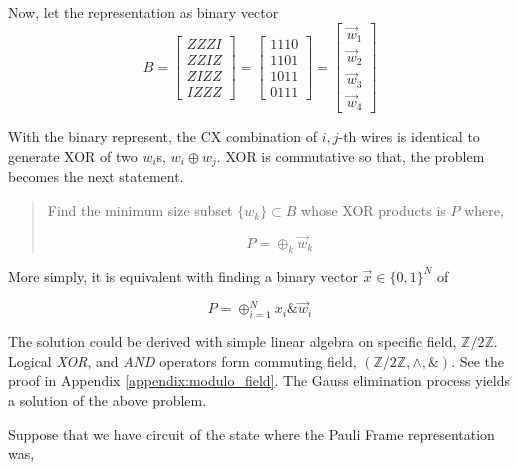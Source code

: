 \documentclass[a4paper,12pt]{article}
\begin{document}
Now, let the representation as binary vector
\begin{equation}
B = \begin{bmatrix}
    ZZZI\\
    ZZIZ\\
    ZIZZ\\
    IZZZ
\end{bmatrix} = \begin{bmatrix}
    1110\\
    1101\\
    1011\\
    0111
\end{bmatrix} = 
\begin{bmatrix}
    \vec{w}_1\\
    \vec{w}_2\\
    \vec{w}_3\\
    \vec{w}_4
\end{bmatrix}
\end{equation}

With the binary represent, 
the CX combination of $i, j$-th wires is identical to generate XOR of two $w_i$s, 
$w_i \oplus w_j$.
XOR is commutative so that, the problem becomes the next statement.

\begin{quotation}
    Find the minimum size subset $\{w_k\} \subset B$ whose XOR products is $P$
    where,

    \begin{equation*}
        P = \oplus_{k} \vec{w}_k 
    \end{equation*}

\end{quotation}

More simply, it is equivalent with finding a binary vector $\vec{x} \in \{0, 1\}^N$ of 

\begin{equation}
    P = \oplus_{i=1}^N x_i \& \vec{w}_i
\end{equation}

The solution could be derived with simple linear algebra on specific field, $\mathbb{Z}/2\mathbb{Z}$.
Logical \textit{XOR}, and \textit{AND} operators form commuting field, $(\mathbb{Z}/2\mathbb{Z} ,\wedge , \&)$.
See the proof in Appendix \ref{appendix:modulo_field}. 
The Gauss elimination process yields a solution of the above problem.

Suppose that we have circuit of the state where the Pauli Frame representation was,
\end{document}
